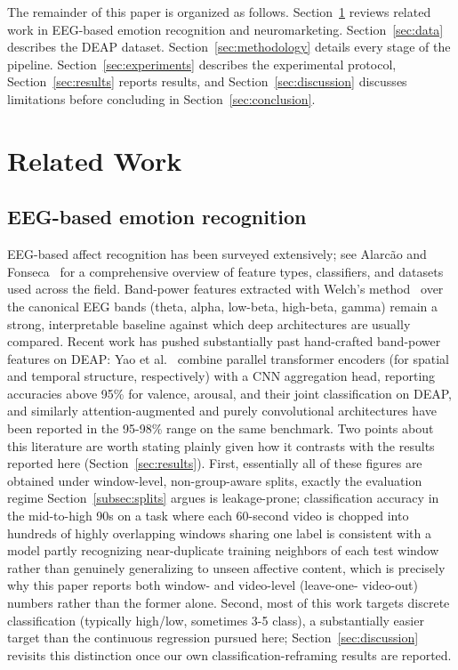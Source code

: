 \documentclass[conference]{IEEEtran}
\begin{document}
The remainder of this paper is organized as follows. Section~\ref{sec:related}
reviews related work in EEG-based emotion recognition and neuromarketing.
Section~\ref{sec:data} describes the DEAP dataset. Section~\ref{sec:methodology}
details every stage of the pipeline. Section~\ref{sec:experiments} describes
the experimental protocol, Section~\ref{sec:results} reports results, and
Section~\ref{sec:discussion} discusses limitations before concluding in
Section~\ref{sec:conclusion}.

\section{Related Work}
\label{sec:related}

\subsection{EEG-based emotion recognition}
EEG-based affect recognition has been surveyed extensively; see
Alarc\~{a}o and Fonseca~\cite{alarcao2019emotions} for a comprehensive
overview of feature types, classifiers, and datasets used across the
field. Band-power features extracted with Welch's
method~\cite{welch1967psd} over the canonical EEG bands (theta, alpha,
low-beta, high-beta, gamma) remain a strong, interpretable baseline against
which deep architectures are usually compared. Recent work has pushed
substantially past hand-crafted band-power features on DEAP: Yao et
al.~\cite{yao2024transformercnn} combine parallel transformer encoders
(for spatial and temporal structure, respectively) with a CNN aggregation
head, reporting accuracies above 95\% for valence, arousal, and their
joint classification on DEAP, and similarly attention-augmented and
purely convolutional architectures have been reported in the
95-98\% range on the same benchmark. Two points about this literature are
worth stating plainly given how it contrasts with the results reported
here (Section~\ref{sec:results}). First, essentially all of these
figures are obtained under window-level, non-group-aware splits, exactly
the evaluation regime Section~\ref{subsec:splits} argues is
leakage-prone; classification accuracy in the mid-to-high 90s on a
task where each 60-second video is chopped into hundreds of
highly overlapping windows sharing one label is consistent with a model
partly recognizing near-duplicate training neighbors of each test window
rather than genuinely generalizing to unseen affective content, which is
precisely why this paper reports both window- and video-level (leave-one-
video-out) numbers rather than the former alone. Second, most of this
work targets discrete classification (typically high/low, sometimes 3-5
class), a substantially easier target than the continuous regression
pursued here; Section~\ref{sec:discussion} revisits this distinction once
our own classification-reframing results are reported.
\end{document}
